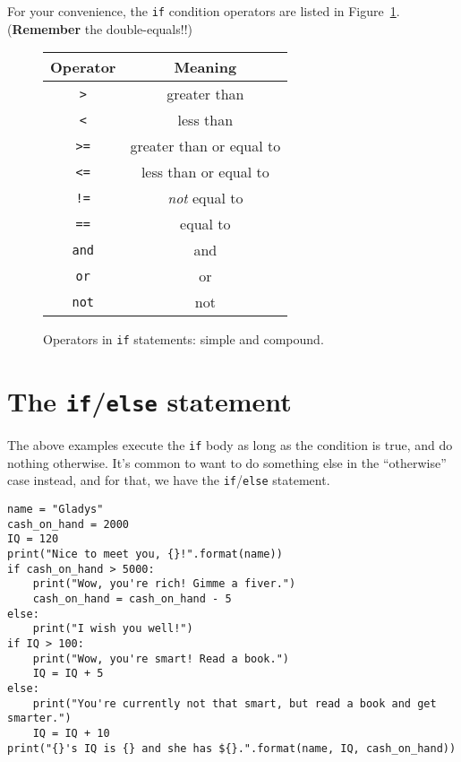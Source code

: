 
For your convenience, the \texttt{if} condition operators are listed in
Figure~\ref{fig:ifStatementOps}. (\textbf{Remember} the double-equals!!)


\begin{figure}[b]
\centering
\small
\bigskip
\begin{tabular}{c|c}
Operator & Meaning \\
\hline
\texttt{>} & greater than \\
\hline
\texttt{<} & less than \\
\hline
\texttt{>=} & greater than or equal to \\
\hline
\texttt{<=} & less than or equal to \\
\hline
\texttt{!=} & \textit{not} equal to \\
\hline
\texttt{==} & equal to \\
\hline
\texttt{and} & and \\
\hline
\texttt{or} & or \\
\hline
\texttt{not} & not \\
\end{tabular}

\bigskip
\normalsize
\caption{Operators in \texttt{if} statements: simple and compound.}
\label{fig:ifStatementOps}
\end{figure}

\section{The \texttt{if}/\texttt{else} statement}

The above examples execute the \texttt{if} body as long as the condition is
true, and do nothing otherwise. It's common to want to do something else in the
``otherwise'' case instead, and for that, we have the \texttt{if}/\texttt{else}
statement.

\begin{Verbatim}[fontsize=\footnotesize,samepage=true,frame=single,framesep=3mm]
name = "Gladys"
cash_on_hand = 2000
IQ = 120
print("Nice to meet you, {}!".format(name))
if cash_on_hand > 5000:
    print("Wow, you're rich! Gimme a fiver.")
    cash_on_hand = cash_on_hand - 5
else:
    print("I wish you well!")
if IQ > 100:
    print("Wow, you're smart! Read a book.")
    IQ = IQ + 5
else:
    print("You're currently not that smart, but read a book and get smarter.")
    IQ = IQ + 10
print("{}'s IQ is {} and she has ${}.".format(name, IQ, cash_on_hand))
\end{Verbatim}
\vspace{-.2in}

